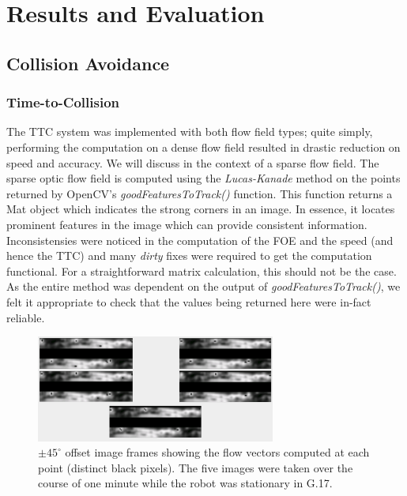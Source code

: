 \documentclass[a4paper,12pt,twoside,openright]{article}
\begin{document}
\newpage

\section{ Results and Evaluation } \label{sec:results}
\subsection{Collision Avoidance}
\subsubsection{Time-to-Collision}
The TTC system was implemented with both flow field types; quite simply, performing the computation on a dense flow
field resulted in drastic reduction on speed and accuracy. We will discuss in the context of a sparse flow field. The
sparse optic flow field is computed using the \textit{Lucas-Kanade} method on the points returned by OpenCV's
\textit{goodFeaturesToTrack()} function. This function returns a Mat object which indicates the strong corners in an image.
In essence, it locates prominent features in the image which can provide consistent information. Inconsistensies
were noticed in the computation of the FOE and the speed (and hence the TTC) and many \textit{dirty} fixes were required to get the computation
functional. For a straightforward matrix calculation, this should not be the case. As the entire method was dependent on
the output of \textit{goodFeaturesToTrack()}, we felt it appropriate to check that the values being returned here were in-fact
reliable.

\begin{figure}
  \centering
  \includegraphics[width=0.7\textwidth]{OpticalFlowInconsistencies}
  \caption{
    \label{fig:ofbad} $\pm 45^{\circ}$ offset image frames showing the flow vectors computed at each point (distinct black
    pixels). The five images were taken over the course of one minute while the robot was stationary in G.17.
  }
\end{figure}
\end{document}

